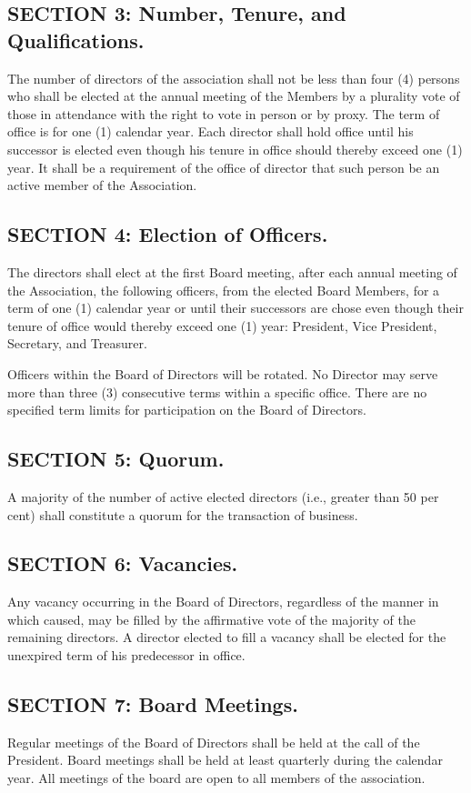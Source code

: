 \subsection{SECTION 3: Number, Tenure, and Qualifications.}
The number of directors of the association shall not be less than four
(4) persons who shall be elected at the annual meeting of the Members
by a plurality vote of those in attendance with the right to vote in
person or by proxy. The term of office is for one (1) calendar year. Each
director shall hold office until his successor is elected even though
his tenure in office should thereby exceed one (1) year. It shall be
a requirement of the office of director that such person be an active
member of the Association.

\subsection{SECTION 4: Election of Officers.}
The directors shall elect at the first Board meeting, after each annual
meeting of the Association, the following officers, from the elected Board
Members, for a term of one (1) calendar year or until their successors
are chose even though their tenure of office would thereby exceed one
(1) year: President, Vice President, Secretary, and Treasurer.

Officers within the Board of Directors will be rotated. No Director
may serve more than three (3) consecutive terms within a specific
office. There are no specified term limits for participation on the
Board of Directors.

\subsection{SECTION 5: Quorum.}
A majority of the number of active elected directors (i.e., greater than
50 per cent) shall constitute a quorum for the transaction of business.

\subsection{SECTION 6: Vacancies.}
Any vacancy occurring in the Board of Directors, regardless of the manner
in which caused, may be filled by the affirmative vote of the majority
of the remaining directors. A director elected to fill a vacancy shall
be elected for the unexpired term of his predecessor in office.

\subsection{SECTION 7: Board Meetings.}
Regular meetings of the Board of Directors shall be held at the call of
the President. Board meetings shall be held at least quarterly during
the calendar year. All meetings of the board are open to all members of
the association.

